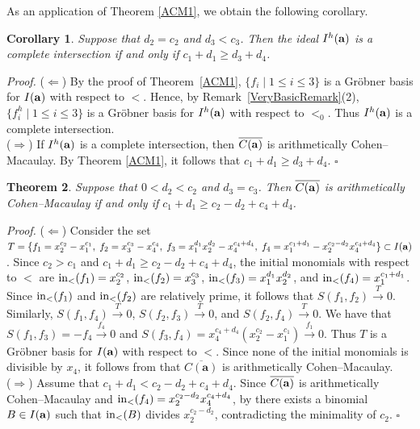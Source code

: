 \documentclass[10pt]{amsart}
\newtheorem{thm1}{Theorem}[section]
\newtheorem{cor1}[thm1]{Corollary}
\begin{document}
As an application of Theorem \ref{ACM1}, we obtain the following corollary. 

\begin{cor1} \label{CorCase11CI} Suppose that $d_2=c_2$ and $d_{3}<c_{3}$. Then the ideal $I^{h}({\bf a})$ is a complete intersection if and only if $c_{1}+d_{1} \geq d_{3}+d_{4}$.
\end{cor1}

{\em \noindent Proof.} ($\Leftarrow$) By the proof of Theorem~\ref{ACM1}, $\{f_i \mid 1\le i\le 3\}$ is a Gr\"obner basis for $I({\bf a})$ with respect to $<$. Hence, by Remark~\ref{VeryBasicRemark}(2), $\{f_i^{h} \mid 1\le i\le 3\}$ is a Gr\"obner basis for $I^{h}({\bf a})$ with respect to $<_0$. Thus $I^{h}({\bf a})$ is a complete intersection.\\ ($\Rightarrow$) If $I^{h}({\bf a})$ is a complete intersection, then $\overline{C({\bf a})}$ is arithmetically Cohen--Macaulay. By Theorem \ref{ACM1}, it follows that $c_1+d_{1} \geq d_{3}+d_{4}$. \hfill $\square$ \par\vspace{0.5\baselineskip}


\begin{thm1} \label{ACM2} Suppose that $0<d_2<c_2$ and $d_{3}=c_{3}$. Then $\overline{C({\bf a})}$ is arithmetically Cohen--Macaulay if and only if $c_{1}+d_{1} \geq c_{2}-d_{2}+c_{4}+d_{4}$.
\end{thm1}

{\em \noindent Proof.} ($\Leftarrow$) Consider the set $T=\{f_1=x_2^{c_2}-x_1^{c_1},\; f_2=x_3^{c_3}-x_4^{c_4},\; f_3=x_1^{d_1}x_2^{d_2}-x_4^{c_4+d_4},\; f_4=x_1^{c_1+d_1}-x_2^{c_2-d_2}x_4^{c_4+d_4}\} \subset I({\bf a})$. Since $c_2>c_1$ and $c_1+d_1 \geq c_2-d_2+c_4+d_4$, the initial monomials with respect to $<$ are ${\rm in}_{<}(f_{1})=x_2^{c_2}$, ${\rm in}_{<}(f_{2})=x_3^{c_3}$, ${\rm in}_{<}(f_{3})=x_1^{d_1}x_2^{d_2}$, and ${\rm in}_{<}(f_4)=x_1^{c_1+d_{1}}$. Since ${\rm in}_{<}(f_1)$ and ${\rm in}_{<}(f_2)$ are relatively prime, it follows that $S(f_{1},f_{2}) \stackrel{T}{\longrightarrow} 0$. Similarly, $S(f_{1},f_4) \stackrel{T}{\longrightarrow} 0$, $S(f_{2},f_{3}) \stackrel{T}{\longrightarrow} 0$, and $S(f_{2},f_4) \stackrel{T}{\longrightarrow} 0$. We have that $S(f_{1},f_{3})=-f_4 \stackrel{f_4}{\longrightarrow} 0$ and $S(f_{3},f_4)=x_4^{c_4+d_4}(x_{2}^{c_2}-x_{1}^{c_1}) \stackrel{f_1}{\longrightarrow} 0$. Thus $T$ is a Gr\"obner basis for $I({\bf a})$ with respect to $<$. Since none of the initial monomials is divisible by $x_4$, it follows from \cite[Theorem~2.2]{HerSta} that $\overline{C(\mathbf a)}$ is arithmetically Cohen--Macaulay.\\
($\Rightarrow$) Assume that $c_{1}+d_{1}<c_{2}-d_{2}+c_{4}+d_{4}$. Since $\overline{C({\bf a})}$ is arithmetically Cohen--Macaulay and ${\rm in}_{<}(f_4)=x_2^{c_2-d_2}x_4^{c_4+d_4}$, by \cite[Theorem~2.2]{HerSta} there exists a binomial $B \in I({\bf a})$ such that ${\rm in}_{<}(B)$ divides $x_2^{c_{2}-d_2}$, contradicting the minimality of $c_2$. \hfill $\square$
\end{document}
